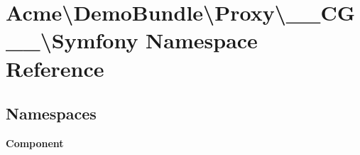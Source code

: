 \section{Acme\textbackslash{}Demo\+Bundle\textbackslash{}Proxy\textbackslash{}\+\_\+\+\_\+\+C\+G\+\_\+\+\_\+\textbackslash{}Symfony Namespace Reference}
\label{namespace_acme_1_1_demo_bundle_1_1_proxy_1_1_____c_g_____1_1_symfony}
\subsection*{Namespaces}
\begin{DoxyCompactItemize}
\item 
 {\bf Component}
\end{DoxyCompactItemize}
